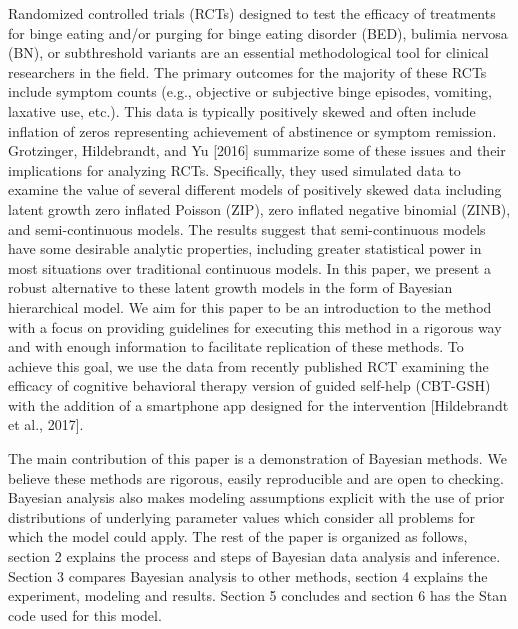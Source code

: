 \documentclass{article}
\begin{document}
Randomized controlled trials (RCTs) designed to test the efficacy of treatments for binge eating and/or purging for binge eating disorder (BED), bulimia nervosa (BN), or subthreshold variants are an essential methodological tool for clinical researchers in the field.  The primary outcomes for the majority of these RCTs include symptom counts (e.g., objective or subjective binge episodes, vomiting, laxative use, etc.). This data is typically positively skewed and often include inflation of zeros representing achievement of abstinence or symptom remission.  Grotzinger, Hildebrandt, and Yu [2016] summarize some of these issues and their implications for analyzing RCTs.  Specifically, they used simulated data to examine the value of several different models of positively skewed data including latent growth zero inflated Poisson (ZIP), zero inflated negative binomial (ZINB), and semi-continuous models.  The results suggest that semi-continuous models have some desirable analytic properties, including greater statistical power in most situations over traditional continuous models.  In this paper, we present a robust alternative to these latent growth models in the form of Bayesian hierarchical model.  We aim for this paper to be an introduction to the method with a focus on providing guidelines for executing this method in a rigorous way and with enough information to facilitate replication of these methods.  To achieve this goal, we use the data from recently published RCT examining the efficacy of cognitive behavioral therapy version of guided self-help (CBT-GSH) with the addition of a smartphone app designed for the intervention [Hildebrandt et al., 2017]. 

The main contribution of this paper is a demonstration of Bayesian methods. We believe these methods are rigorous, easily reproducible and are open to checking. Bayesian analysis also makes modeling assumptions explicit with the use of prior distributions of underlying parameter values which consider all  problems for which the model could apply.  The rest of the paper is organized as follows, section 2 explains the process and steps of Bayesian data analysis and inference. Section 3 compares Bayesian analysis to other methods, section 4 explains the experiment, modeling and results. Section 5 concludes and section 6 has the Stan code used for this model.
\end{document}
